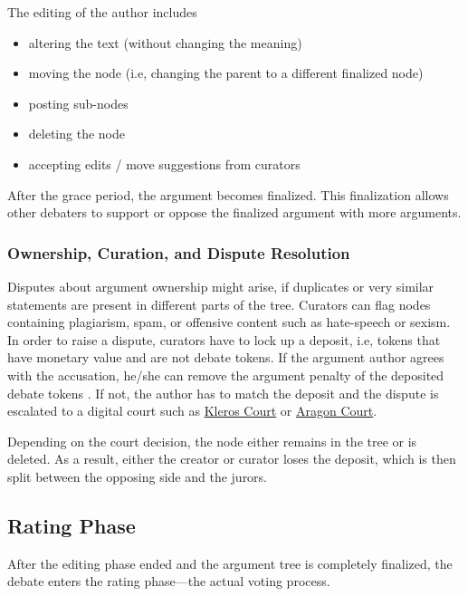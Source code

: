 \documentclass[%
aip,
amsmath,amssymb,
reprint,%
unsortedaddress,
nofootinbib
]{revtex4-2}
\begin{document}
The editing of the author includes 
\begin{itemize}[noitemsep]
	\item altering the text (without changing the meaning) %
	\item moving the node (i.e, changing the parent to a different finalized node)%
	\item posting sub-nodes
	\item deleting the node
	\item accepting edits / move suggestions from curators
\end{itemize}
After the grace period, the argument becomes finalized.
This finalization allows other debaters to support or oppose the finalized argument with more arguments.


\subsubsection*{Ownership, Curation, and Dispute Resolution}
Disputes about argument ownership might arise, 
if duplicates or very similar statements are present in different parts of the tree.
Curators can flag nodes containing 
plagiarism, 
spam, or 
offensive content such as hate-speech or sexism. 
In order to raise a dispute, 
curators have to lock up a deposit, 
i.e, tokens that have monetary value and are not debate tokens. 
If the argument author agrees with the accusation, he/she can remove the argument  penalty of the deposited debate tokens . 
If not, the author has to match the deposit and the dispute is escalated to a digital court such as \href{https://kleros.io/}{Kleros Court}\cite{Lesaege2019,Lesaege2021} or \href{https://anj.aragon.org/}{Aragon Court}\cite{Cuende2019}.

Depending on the court decision, the node either remains in the tree or is deleted.
As a result, either the creator or curator loses the deposit, which is then split between the opposing side and the jurors. 


\subsection{Rating Phase}\label{sec:RatingPhase} %
After the editing phase ended and the argument tree is completely finalized,
the debate enters the rating phase---the actual voting process.
\end{document}
